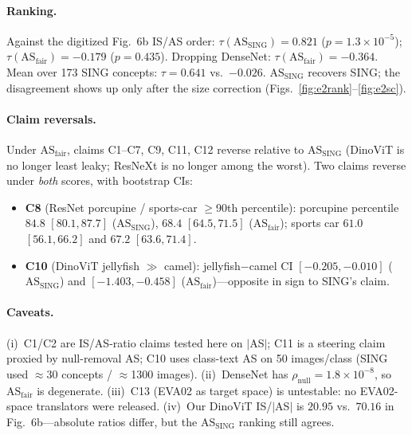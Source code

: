 \documentclass[10pt,twocolumn]{article}
\begin{document}
\paragraph{Ranking.}
Against the digitized Fig.~6b IS/AS order:
$\tau(\mathrm{AS}_{\mathrm{SING}}){=}0.821$ ($p{=}1.3{\times}10^{-5}$);
$\tau(\mathrm{AS}_{\mathrm{fair}}){=}{-}0.179$ ($p{=}0.435$).
Dropping DenseNet: $\tau(\mathrm{AS}_{\mathrm{fair}}){=}{-}0.364$.
Mean over 173 SING concepts: $\tau{=}0.641$ vs.\ $-0.026$.
$\mathrm{AS}_{\mathrm{SING}}$ recovers SING; the disagreement shows up only after the size correction (Figs.~\ref{fig:e2rank}--\ref{fig:e2sc}).

\paragraph{Claim reversals.}
Under $\mathrm{AS}_{\mathrm{fair}}$, claims C1--C7, C9, C11, C12 reverse relative to $\mathrm{AS}_{\mathrm{SING}}$ (DinoViT is no longer least leaky; ResNeXt is no longer among the worst).
Two claims reverse under \emph{both} scores, with bootstrap CIs:
\begin{itemize}
\item \textbf{C8} (ResNet porcupine / sports-car $\ge$90th percentile): porcupine percentile $84.8$ $[80.1,87.7]$ ($\mathrm{AS}_{\mathrm{SING}}$), $68.4$ $[64.5,71.5]$ ($\mathrm{AS}_{\mathrm{fair}}$); sports car $61.0$ $[56.1,66.2]$ and $67.2$ $[63.6,71.4]$.
\item \textbf{C10} (DinoViT jellyfish $\gg$ camel): jellyfish$-$camel CI $[{-}0.205,{-}0.010]$ ($\mathrm{AS}_{\mathrm{SING}}$) and $[{-}1.403,{-}0.458]$ ($\mathrm{AS}_{\mathrm{fair}}$)---opposite in sign to SING's claim.
\end{itemize}

\paragraph{Caveats.}
(i)~C1/C2 are IS/AS-ratio claims tested here on $|$AS$|$; C11 is a steering claim proxied by null-removal AS; C10 uses class-text AS on 50 images/class (SING used $\approx$30 concepts / $\approx$1300 images).
(ii)~DenseNet has $\rho_{\mathrm{null}}{=}1.8{\times}10^{-8}$, so $\mathrm{AS}_{\mathrm{fair}}$ is degenerate.
(iii)~C13 (EVA02 as target space) is untestable: no EVA02-space translators were released.
(iv)~Our DinoViT IS/$|$AS$|$ is $20.95$ vs.\ $70.16$ in Fig.~6b---absolute ratios differ, but the $\mathrm{AS}_{\mathrm{SING}}$ ranking still agrees.
\end{document}
